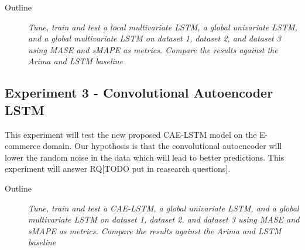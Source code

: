 \begin{description}
  \item[Outline]{\it Tune, train and test a local multivariate LSTM, a global univariate LSTM,
              and a global multivariate LSTM on dataset 1,
              dataset 2, and dataset 3 using MASE and sMAPE as metrics. Compare the results against the Arima and LSTM baseline}
\end{description}

\subsection{Experiment 3 - Convolutional Autoencoder LSTM}
This experiment will test the new proposed CAE-LSTM model on
the E-commerce domain. Our hypothosis is that the convolutional autoencoder
will lower the random noise in the data which will lead to better predictions.
This experiment will answer RQ[TODO put in reasearch questions].

\begin{description}
  \item[Outline]{\it Tune, train and test a CAE-LSTM, a global univariate LSTM,
              and a global multivariate LSTM on dataset 1,
              dataset 2, and dataset 3 using MASE and sMAPE as metrics. Compare the results against the Arima and LSTM baseline}
\end{description}